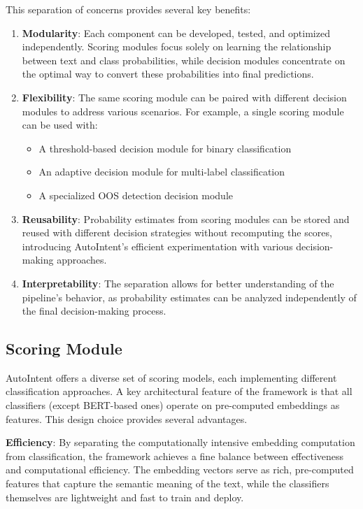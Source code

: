 This separation of concerns provides several key benefits:

\begin{enumerate}
    \item \textbf{Modularity}: Each component can be developed, tested, and optimized independently. Scoring modules focus solely on learning the relationship between text and class probabilities, while decision modules concentrate on the optimal way to convert these probabilities into final predictions.
    
    \item \textbf{Flexibility}: The same scoring module can be paired with different decision modules to address various scenarios. For example, a single scoring module can be used with:
    \begin{itemize}
        \item A threshold-based decision module for binary classification
        \item An adaptive decision module for multi-label classification
        \item A specialized OOS detection decision module
    \end{itemize}
    
    \item \textbf{Reusability}: Probability estimates from scoring modules can be stored and reused with different decision strategies without recomputing the scores, introducing AutoIntent's efficient experimentation with various decision-making approaches.
    
    \item \textbf{Interpretability}: The separation allows for better understanding of the pipeline's behavior, as probability estimates can be analyzed independently of the final decision-making process.
\end{enumerate}

\subsection{Scoring Module}

AutoIntent offers a diverse set of scoring models, each implementing different classification approaches. A key architectural feature of the framework is that all classifiers (except BERT-based ones) operate on pre-computed embeddings as features. This design choice provides several advantages.

\textbf{Efficiency}: By separating the computationally intensive embedding computation from classification, the framework achieves a fine balance between effectiveness and computational efficiency. The embedding vectors serve as rich, pre-computed features that capture the semantic meaning of the text, while the classifiers themselves are lightweight and fast to train and deploy.
    
